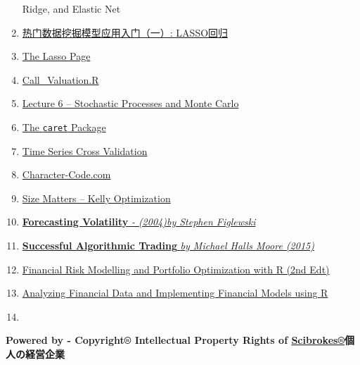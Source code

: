 \documentclass[]{tufte-book}
\begin{document}
\begin{enumerate}
{{  Ridge, and Elastic Net}} 
\item
  \href{http://cos.name/2016/10/data-mining-1-lasso/}{{热门数据挖掘模型应用入门（一）:
  LASSO回归}}
\item
  \href{http://statweb.stanford.edu/~tibs/lasso.html}{{The Lasso Page}}
\item
  \href{https://api.rpubs.com/Mariano/call}{{Call\_Valuation.R}}
\item
  \href{http://zorro-trader.com/manual/en/Lecture\%206.htm}{{Lecture 6
  -- Stochastic Processes and Monte Carlo}}
\item
  \href{http://topepo.github.io/caret/index.html}{{The \texttt{caret}
  Package}} 
\item
  \href{https://rpubs.com/crossxwill/time-series-cv}{{Time Series Cross
  Validation}} 
\item
  \href{http://character-code.com/}{{Character-Code.com}}
\item
  \href{https://alphaism.wordpress.com/2012/03/26/size-matters-kelly-optimization/}{{Size
  Matters -- Kelly Optimization}} 
\item
  \href{https://raw.githubusercontent.com/englianhu/binary.com-interview-question/fcad2844d7f10c486f3601af9932f49973548e4b/reference/Focasting\%20Volatility.pdf}{{\textbf{Forecasting
  Volatility} \emph{- (2004)by Stephen Figlewski}}}
\item
  \href{https://raw.githubusercontent.com/englianhu/binary.com-interview-question/fcad2844d7f10c486f3601af9932f49973548e4b/reference/Successful\%20Algorithmic\%20Trading.pdf}{{\textbf{Successful
  Algorithmic Trading} \emph{by Michael Halls Moore (2015)}}}
\item
  \href{https://github.com/englianhu/binary.com-interview-question/blob/eec3bbe99c61b4e2e2f4a2b1c47e7a2fca6106c4/reference/Financial\%20Risk\%20Modelling\%20and\%20Portfolio\%20Optimization\%20with\%20R\%20(2nd\%20Edt).pdf}{{Financial
  Risk Modelling and Portfolio Optimization with R (2nd Edt)}} 
\item
  \href{https://github.com/englianhu/binary.com-interview-question/blob/eec3bbe99c61b4e2e2f4a2b1c47e7a2fca6106c4/reference/Analyzing\%20Financial\%20Data\%20and\%20Implementing\%20Financial\%20Models\%20using\%20R.pdf}{{Analyzing
  Financial Data and Implementing Financial Models using R}} 
\item
  \href{}{{}}
\end{enumerate}

\textbf{Powered by - Copyright® Intellectual Property Rights of
\href{http://www.scibrokes.com}{{Scibrokes®}}個人の経営企業}
\end{document}

